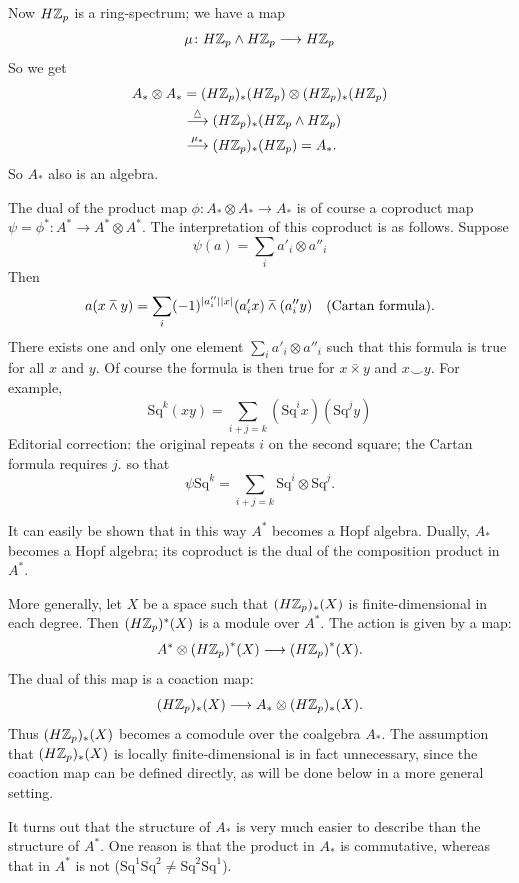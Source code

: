 \documentclass[../main]{subfiles}
\begin{document}
Now $H\mathbb{Z}_p$ is a ring-spectrum; we have a map
\[ \mu\colon H\mathbb{Z}_p\wedge H\mathbb{Z}_p\longrightarrow H\mathbb{Z}_p \]
So we get
\begin{align*}
    A_\ast\otimes A_\ast &= (H\mathbb{Z}_p)_\ast(H\mathbb{Z}_p)\otimes(H\mathbb{Z}_p)_\ast(H\mathbb{Z}_p) \\
    &\overset{\underline{\wedge}}\longrightarrow(H\mathbb{Z}_p)_\ast(H\mathbb{Z}_p\wedge H\mathbb{Z}_p) \\
    &\overset{\mu_\ast}\longrightarrow(H\mathbb{Z}_p)_\ast(H\mathbb{Z}_p)=A_\ast.
\end{align*}
So $A_\ast$ also is an algebra.

The dual of the product map $\phi\colon A_\ast\otimes A_\ast\longrightarrow A_\ast$ is of course a coproduct map $\psi=\phi^\ast\colon A^\ast\longrightarrow A^\ast\otimes A^\ast$. The interpretation of this coproduct is as follows. Suppose
\[ \psi(a) = \sum_ia'_i\otimes a''_i \]
Then
\[ a(x\barwedge y)=\sum_i(-1)^{\lvert a''_i\rvert\lvert x\rvert}(a'_ix)\barwedge(a''_iy) \quad \text{(Cartan formula).} \]
There exists one and only one element $\sum\limits_i a'_i\otimes a''_i$ such that this formula is true for all $x$ and $y$. Of course the formula is then true for $x\bar\times y$ %
and $x\smile y$. %
For example,
\[ \mathrm{Sq}^k(xy)=\sum_{i+j=k} (\mathrm{Sq}^ix)(\mathrm{Sq}^jy) \]
\noindent Editorial correction: the original repeats $i$ on the second square; the Cartan formula requires $j$.
so that
\[ \psi \mathrm{Sq}^k=\sum_{i+j=k} \mathrm{Sq}^i\otimes \mathrm{Sq}^j. \]

It can easily be shown that in this way $A^\ast$ becomes a Hopf algebra. Dually, $A_\ast$ becomes a Hopf algebra; its coproduct is the dual of the composition product in $A^\ast$.

More generally, let $X$ be a space such that $(H\mathbb{Z}_p)_\ast(X)$ is finite-dimensional in each degree. Then $(H\mathbb{Z}_p)^\ast(X)$ is a module over $A^\ast$. The action is given by a map:
\[ A^\ast\otimes{(H\mathbb{Z}_p)}^\ast(X)\longrightarrow{(H\mathbb{Z}_p)}^\ast(X) . \]
The dual of this map is a coaction map:
\[ (H\mathbb{Z}_p)_\ast(X)\longrightarrow A_\ast\otimes(H\mathbb{Z}_p)_\ast(X) . \]
Thus $(H\mathbb{Z}_p)_\ast(X)$ becomes a comodule over the coalgebra $A_\ast$. The assumption that $(H\mathbb{Z}_p)_\ast(X)$ is locally finite-dimensional is in fact unnecessary, since the coaction map can be defined directly, as will be done below in a more general setting.

It turns out that the structure of $A_\ast$ is very much easier to describe than the structure of $A^\ast$. One reason is that the product in $A_\ast$ is commutative, whereas that in $A^\ast$ is not ($\mathrm{Sq}^1\mathrm{Sq}^2\neq \mathrm{Sq}^2\mathrm{Sq}^1$).
\end{document}
